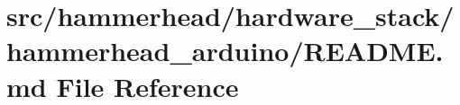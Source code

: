 \hypertarget{hardware__stack_2hammerhead__arduino_2README_8md}{}\section{src/hammerhead/hardware\+\_\+stack/hammerhead\+\_\+arduino/\+R\+E\+A\+D\+ME.md File Reference}
\label{hardware__stack_2hammerhead__arduino_2README_8md}

